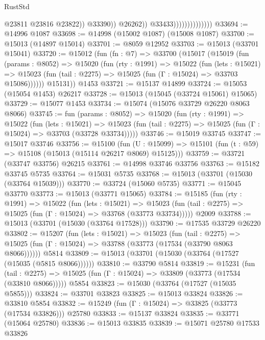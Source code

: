\begin{lexlean}{RustStd}
\begin{coremodule}
                                            @23811
                                            @23816
                                            @23822))
                                        @33390))
                                    @26262))
                                @33433))))))))))))))
@33694 := @14996 @1087
@33698 := @14998 (@15002 @1087) (@15008 @1087)
@33700 := @15013 (@14897 @15014)
@33701 := @8059 @12952
@33703 := @15013 (@33701 @15041)
@33720 := @15012
    (fun (fn : @7) =>
    @33700
      (@15017
        (@15019
          (fun (params : @8052) =>
          @15020
            (fun (rty : @1991) =>
            @15022
              (fun (lets : @15021) =>
              @15023 (fun (tail : @2275) => @15025 (fun (Γ : @15024) => @33703 @15086))))))
        @15131))
    @1453
@33721 := @15137 @14899
@33724 := @15053 (@15054 @1453) @26217
@33728 := @15013 (@15045 (@33724 @15061) @15065)
@33729 := @15077 @1453
@33734 := @15074 (@15076 @33729 @26220 @8063 @8066)
@33745 := fun (params : @8052) =>
  @15020
    (fun (rty : @1991) =>
    @15022
      (fun (lets : @15021) =>
      @15023 (fun (tail : @2275) => @15025 (fun (Γ : @15024) => @33703 (@33728 @33734)))))
@33746 := @15019 @33745
@33747 := @15017 @33746
@33756 := @15100
    (fun (U : @15099) => @15101 (fun (t : @59) => @15108 (@15013 (@15114 @26217 @8069) @15125)))
@33759 := @33721 (@33747 @33756) @26215
@33761 := @14998 @33746 @33756
@33763 := @15182 @33745 @5735
@33764 := @15031 @5735
@33768 := @15013 (@33701 (@15030 (@33764 @15039)))
@33770 := @33724 (@15060 @5735)
@33771 := @15045 @33770
@33773 := @15013 (@33771 @15065)
@33784 := @15185
    (fun (rty : @1991) =>
    @15022
      (fun (lets : @15021) =>
      @15023 (fun (tail : @2275) => @15025 (fun (Γ : @15024) => @33768 (@33773 @33734)))))
    @2009
@33788 := @15013 (@33701 (@15030 (@33764 @17528)))
@33790 := @17535 @33729 @26220
@33802 := @15207
    (fun (lets : @15021) =>
    @15023
      (fun (tail : @2275) =>
      @15025 (fun (Γ : @15024) => @33788 (@33773 (@17534 (@33790 @8063 @8066))))))
    @5814
@33809 := @15013 (@33701 (@15030 (@33764 (@17527 (@15035 (@5815 @8066))))))
@33810 := @33790 @5814
@33819 := @15231
    (fun (tail : @2275) => @15025 (fun (Γ : @15024) => @33809 (@33773 (@17534 (@33810 @8066)))))
    @5854
@33823 := @15030 (@33764 (@17527 (@15035 @5855)))
@33824 := @33701 @33823
@33825 := @15013 @33824
@33826 := @33810 @5854
@33832 := @15249 (fun (Γ : @15024) => @33825 (@33773 (@17534 @33826))) @25780
@33833 := @15137 @33824
@33835 := @33771 (@15064 @25780)
@33836 := @15013 @33835
@33839 := @15071 @25780 @17533 @33826

\end{coremodule}
\end{lexlean}
